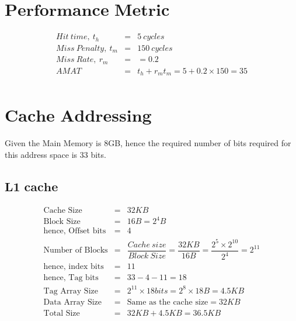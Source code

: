 \documentclass{tufte-handout}
\begin{document}
\section{$\textbf{Performance Metric}$}
	\begin{eqnarray*}
		Hit\ time,\ t_h &=& 5\ cycles \\
		Miss\ Penalty,\ t_m &=& 150\ cycles \\
		Miss\ Rate,\ r_m &=& = 0.2 \\
		AMAT &=& t_h + r_mt_m = 5 + 0.2\times 150 = 35 \\
	\end{eqnarray*}

\section{$\textbf{Cache Addressing}$}
	Given the Main Memory is 8GB, hence the required number of bits required for this address space is 33 bits.
	\subsection{$\textbf{L1 cache}$}
		\begin{eqnarray*}
			\mbox{Cache Size} &=& 32KB     \\
			\mbox{Block Size} &=& 16B = 2^4 B      \\
			\mbox{hence, Offset bits} &=& 4     \\
			\mbox{Number of Blocks} &=& \dfrac{Cache\ size}{Block\ Size} = \dfrac{32KB}{16B} = \dfrac{2^5 \times 2^{10}}{2^4} = 2^{11}      \\
			\mbox{hence, index bits} &=&  11    \\
			\mbox{hence, Tag bits} &=& 33 -4 -11 = 18      \\
			\mbox{Tag Array Size} &=& 2^{11}\times 18 bits = 2^{8}\times 18 B = 4.5 KB\\
			\mbox{Data Array Size} &=& \mbox{Same as the cache size} = 32KB \\
			\mbox{Total Size} &=& 32 KB + 4.5 KB = 36.5 KB\\
		\end{eqnarray*}
\end{document}
